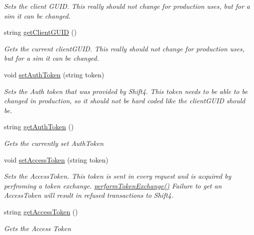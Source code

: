 \begin{DoxyCompactItemize}
\begin{DoxyCompactList}\small\item\em Sets the client G\+U\+ID. This really should not change for production uses, but for a sim it can be changed. \end{DoxyCompactList}\item 
string \mbox{\hyperlink{interface_form_sim_1_1_f_r_c___handler_a66f72d339aebc7c5b434026953a79044}{get\+Client\+G\+U\+ID}} ()
\begin{DoxyCompactList}\small\item\em Gets the current client\+G\+U\+ID. This really should not change for production uses, but for a sim it can be changed. \end{DoxyCompactList}\item 
void \mbox{\hyperlink{interface_form_sim_1_1_f_r_c___handler_a1314ea0937067435e3326818baa9d0c1}{set\+Auth\+Token}} (string token)
\begin{DoxyCompactList}\small\item\em Sets the Auth token that was provided by Shift4. This token needs to be able to be changed in production, so it should not be hard coded like the client\+G\+U\+ID should be. \end{DoxyCompactList}\item 
string \mbox{\hyperlink{interface_form_sim_1_1_f_r_c___handler_aeebaee9e36c649daae23db9fc710b261}{get\+Auth\+Token}} ()
\begin{DoxyCompactList}\small\item\em Gets the currently set Auth\+Token \end{DoxyCompactList}\item 
void \mbox{\hyperlink{interface_form_sim_1_1_f_r_c___handler_a6a11b11aaf8b033b87de9fddaf2d325e}{set\+Access\+Token}} (string token)
\begin{DoxyCompactList}\small\item\em Sets the Access\+Token. This token is sent in every request and is acquired by perfroming a token exchange. \mbox{\hyperlink{interface_form_sim_1_1_f_r_c___handler_a32c299d3cb3cdd6c444e76b3671af1b4}{perform\+Token\+Exchange()}} Failure to get an Access\+Token will result in refused transactions to Shift4. \end{DoxyCompactList}\item 
string \mbox{\hyperlink{interface_form_sim_1_1_f_r_c___handler_ad24521be35d127e83221c3c7ecf6fbf8}{get\+Access\+Token}} ()
\begin{DoxyCompactList}\small\item\em Gets the Access Token \end{DoxyCompactList}\item 

\end{DoxyCompactItemize}

